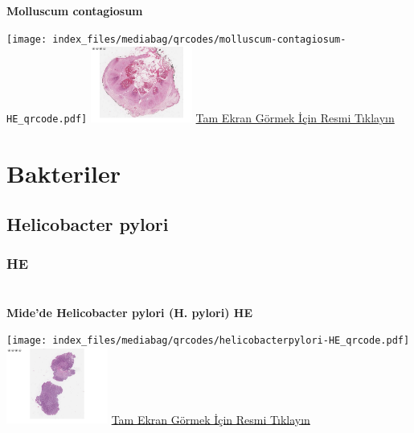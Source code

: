 \documentclass[
  letterpaper,
  DIV=11,
  numbers=noendperiod]{scrreprt}
\begin{document}
\textbf{Molluscum contagiosum}

\texttt{[image: index\_files/mediabag/qrcodes/molluscum-contagiosum-HE\_qrcode.pdf]}
\href{https://images.patolojiatlasi.com/molluscum-contagiosum/HE.html}{\includegraphics[width=0.25\textwidth,height=\textheight]{./screenshots/thumbnail_molluscum-contagiosum.png}}
\href{https://images.patolojiatlasi.com/molluscum-contagiosum/HE.html}{Tam
Ekran Görmek İçin Resmi Tıklayın}

\hypertarget{sec-bakteriler}{%
\chapter{Bakteriler}\label{sec-bakteriler}}

\hypertarget{sec-helicobacter-pylori}{%
\section{Helicobacter pylori}\label{sec-helicobacter-pylori}}

\hypertarget{he-4}{%
\subsection{HE}\label{he-4}}

\hypertarget{section}{%
\chapter{}\label{section}}

\textbf{Mide'de Helicobacter pylori (H. pylori) HE}

\texttt{[image: index\_files/mediabag/qrcodes/helicobacterpylori-HE\_qrcode.pdf]}
\href{https://images.patolojiatlasi.com/helicobacterpylori/HE.html}{\includegraphics[width=0.25\textwidth,height=\textheight]{./screenshots/thumbnail_helicobacterpylori.png}}
\href{https://images.patolojiatlasi.com/helicobacterpylori/HE.html}{Tam
Ekran Görmek İçin Resmi Tıklayın}
\end{document}
